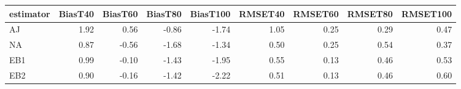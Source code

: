 \begin{table}[ht]
\centering
\begin{tabular}{lrrrrrrrr}
  \toprule
estimator & BiasT40 & BiasT60 & BiasT80 & BiasT100 & RMSET40 & RMSET60 & RMSET80 & RMSET100 \\ 
  \midrule
AJ & 1.92 & 0.56 & -0.86 & -1.74 & 1.05 & 0.25 & 0.29 & 0.47 \\ 
  NA & 0.87 & -0.56 & -1.68 & -1.34 & 0.50 & 0.25 & 0.54 & 0.37 \\ 
  EB1 & 0.99 & -0.10 & -1.43 & -1.95 & 0.55 & 0.13 & 0.46 & 0.53 \\ 
  EB2 & 0.90 & -0.16 & -1.42 & -2.22 & 0.51 & 0.13 & 0.46 & 0.60 \\ 
   \bottomrule
\end{tabular}
\end{table}
